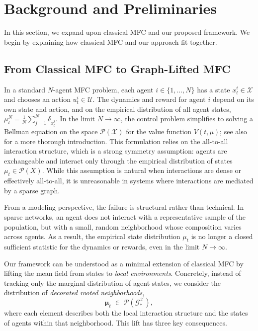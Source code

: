 \documentclass{article}
\begin{document}
\section{Background and Preliminaries}
In this section, we expand upon classical MFC and our proposed framework. We begin by explaining how classical MFC and our approach fit together.

\subsection{From Classical MFC to Graph-Lifted MFC}

In a standard $N$-agent MFC problem, each agent $i \in \{1, \dots, N\}$ has a state $x_t^i \in \mathcal{X}$ and chooses an action $u_t^i \in \mathcal{U}$. The dynamics and reward for agent $i$ depend on its own state and action, and on the empirical distribution of all agent states, $\mu_t^N = \frac{1}{N}\sum_{j=1}^N \delta_{x_t^j}$. In the limit $N \to \infty$, the control problem simplifies to solving a Bellman equation on the space $\mathcal{P}(\mathcal{X})$ for the value function $V(t, \mu)$; see also \cite{gu2023dynamic} for a more thorough introduction. This formulation relies on the all-to-all interaction structure, which is a strong symmetry assumption: agents are exchangeable and interact only through the empirical distribution of states $\mu_t \in \mathcal P(X)$. While this assumption is natural when interactions are dense or effectively all-to-all, it is unreasonable in systems where interactions are mediated by a sparse graph.

From a modeling perspective, the failure is structural rather than technical. In sparse networks, an agent does not interact with a representative sample of the population, but with a small, random neighborhood whose composition varies across agents. As a result, the empirical state distribution $\mu_t$ is no longer a closed sufficient statistic for the dynamics or rewards, even in the limit $N \to \infty$.

Our framework can be understood as a minimal extension of classical MFC by lifting the mean field from states to \emph{local environments}. Concretely, instead of tracking only the marginal distribution of agent states, we consider the distribution of \emph{decorated rooted neighborhoods},
\[
\boldsymbol\mu_t \;\in\; \mathcal P(\mathcal G^\mathcal X_\ast),
\]
where each element describes both the local interaction structure and the states of agents within that neighborhood.
This lift has three key consequences.
\end{document}
